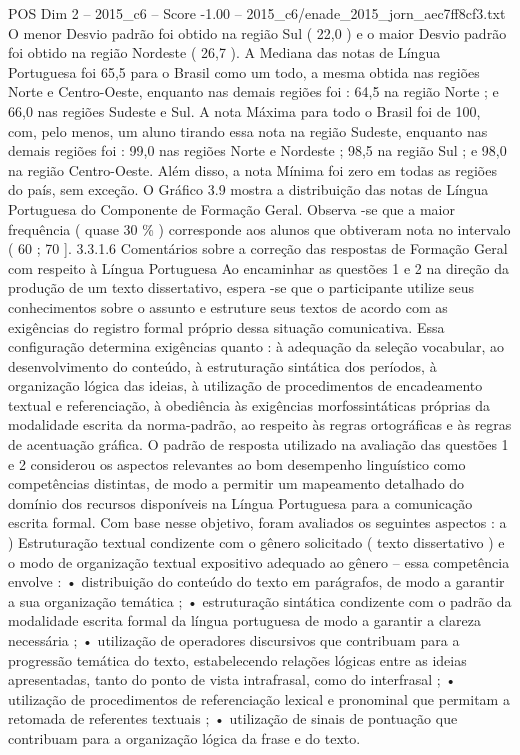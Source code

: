 \begin{textsample}{POS Dim 2 – 2015\_c6 – Score -1.00 – 2015\_c6/enade\_2015\_jorn\_aec7ff8cf3.txt}
O menor Desvio padrão foi obtido na região Sul ( 22,0 ) e o maior Desvio padrão foi obtido na região Nordeste ( 26,7 ).
A Mediana das notas de Língua Portuguesa foi 65,5 para o Brasil como um todo, a mesma obtida nas regiões Norte e Centro-Oeste, enquanto nas demais regiões foi : 64,5 na região Norte ; e 66,0 nas regiões Sudeste e Sul.
A nota Máxima para todo o Brasil foi de 100, com, pelo menos, um aluno tirando essa nota na região Sudeste, enquanto nas demais regiões foi : 99,0 nas regiões Norte e Nordeste ; 98,5 na região Sul ; e 98,0 na região Centro-Oeste.
Além disso, a nota Mínima foi zero em todas as regiões do país, sem exceção.
O Gráfico 3.9 mostra a distribuição das notas de Língua Portuguesa do Componente de Formação Geral.
Observa -se que a maior frequência ( quase 30 \% ) corresponde aos alunos que obtiveram nota no intervalo ( 60 ; 70 ]. 3.3.1.6 Comentários sobre a correção das respostas de Formação Geral com respeito à Língua Portuguesa Ao encaminhar as questões 1 e 2 na direção da produção de um texto dissertativo, espera -se que o participante utilize seus conhecimentos sobre o assunto e estruture seus textos de acordo com as exigências do registro formal próprio dessa situação comunicativa.
Essa configuração determina exigências quanto : à adequação da seleção vocabular, ao desenvolvimento do conteúdo, à estruturação sintática dos períodos, à organização lógica das ideias, à utilização de procedimentos de encadeamento textual e referenciação, à obediência às exigências morfossintáticas próprias da modalidade escrita da norma-padrão, ao respeito às regras ortográficas e às regras de acentuação gráfica.
O padrão de resposta utilizado na avaliação das questões 1 e 2 considerou os aspectos relevantes ao bom desempenho linguístico como competências distintas, de modo a permitir um mapeamento detalhado do domínio dos recursos disponíveis na Língua Portuguesa para a comunicação escrita formal.
Com base nesse objetivo, foram avaliados os seguintes aspectos : a ) Estruturação textual condizente com o gênero solicitado ( texto dissertativo ) e o modo de organização textual expositivo adequado ao gênero – essa competência envolve : • distribuição do conteúdo do texto em parágrafos, de modo a garantir a sua organização temática ; • estruturação sintática condizente com o padrão da modalidade escrita formal da língua portuguesa de modo a garantir a clareza necessária ; • utilização de operadores discursivos que contribuam para a progressão temática do texto, estabelecendo relações lógicas entre as ideias apresentadas, tanto do ponto de vista intrafrasal, como do interfrasal ; • utilização de procedimentos de referenciação lexical e pronominal que permitam a retomada de referentes textuais ; • utilização de sinais de pontuação que contribuam para a organização lógica da frase e do texto.

\end{textsample}
